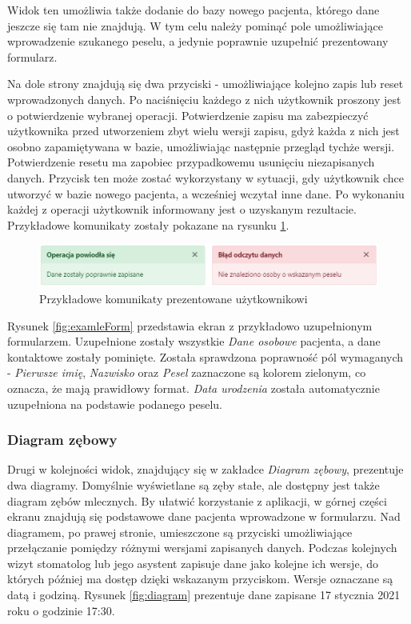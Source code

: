 Widok ten umożliwia także dodanie do bazy nowego pacjenta, którego dane jeszcze się tam nie znajdują. W tym celu należy pominąć pole umożliwiające wprowadzenie szukanego peselu, a jedynie poprawnie uzupełnić prezentowany formularz.

Na dole strony znajdują się dwa przyciski - umożliwiające kolejno zapis lub reset wprowadzonych danych. Po naciśnięciu każdego z nich użytkownik proszony jest o potwierdzenie wybranej operacji. Potwierdzenie zapisu ma zabezpieczyć użytkownika przed utworzeniem zbyt wielu wersji zapisu, gdyż każda z nich jest osobno zapamiętywana w bazie, umożliwiając następnie przegląd tychże wersji. Potwierdzenie resetu ma zapobiec przypadkowemu usunięciu niezapisanych danych. Przycisk ten może zostać wykorzystany w sytuacji, gdy użytkownik chce utworzyć w bazie nowego pacjenta, a wcześniej wczytał inne dane. Po wykonaniu każdej z operacji użytkownik informowany jest o uzyskanym rezultacie. Przykładowe komunikaty zostały pokazane na rysunku \ref{fig:komunikaty}.

\begin{figure}[ht!]
\centering\includegraphics[width=130mm]{figures/komunikaty.PNG}
\caption{Przykładowe komunikaty prezentowane użytkownikowi}
\label{fig:komunikaty}
\end{figure}

Rysunek \ref{fig:examleForm} przedstawia ekran z przykładowo uzupełnionym formularzem. Uzupełnione zostały wszystkie \textit{Dane osobowe} pacjenta, a dane kontaktowe zostały pominięte. Została sprawdzona poprawność pól wymaganych - \textit{Pierwsze imię}, \textit{Nazwisko} oraz \textit{Pesel} zaznaczone są kolorem zielonym, co oznacza, że mają prawidłowy format. \textit{Data urodzenia} została automatycznie uzupełniona na podstawie podanego peselu.


\subsubsection{Diagram zębowy}

Drugi w kolejności widok, znajdujący się w zakładce \textit{Diagram zębowy}, prezentuje dwa diagramy. Domyślnie wyświetlane są zęby stałe, ale dostępny jest także diagram zębów mlecznych. By ułatwić korzystanie z aplikacji, w górnej części ekranu znajdują się podstawowe dane pacjenta wprowadzone w formularzu. Nad diagramem, po prawej stronie, umieszczone są przyciski umożliwiające przełączanie pomiędzy różnymi wersjami zapisanych danych. Podczas kolejnych wizyt stomatolog lub jego asystent zapisuje dane jako kolejne ich wersje, do których później ma dostęp dzięki wskazanym przyciskom. Wersje oznaczane są datą i godziną. Rysunek \ref{fig:diagram} prezentuje dane zapisane 17 stycznia 2021 roku o godzinie 17:30.

